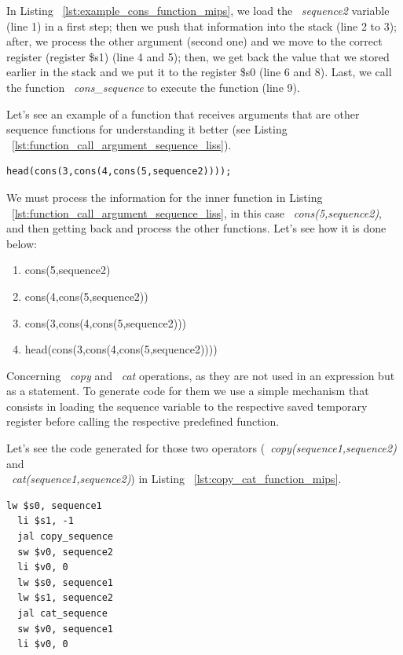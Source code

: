 \documentclass[
  oneside,
  11pt, a4paper,
  footinclude=true,
  headinclude=true,
  cleardoublepage=empty
]{scrbook}
\begin{document}
In Listing ~\ref{lst:example_cons_function_mips}, we load the ~\textit{sequence2} variable (line 1) in a first step; then we push that information into the stack (line 2 to 3); after, we process the other argument (second one) and we move to the correct register (register \$s1) (line 4 and 5); then, we get back the value that we stored earlier in the stack and we put it to the register \$s0 (line 6 and 8). Last, we call the function ~\textit{cons\_sequence} to execute the function (line 9).

Let's see an example of a function that receives arguments that are other sequence functions for understanding it better (see Listing ~\ref{lst:function_call_argument_sequence_liss}).

\begin{lstlisting}[caption={Example of using a function call as argument},label={lst:function_call_argument_sequence_liss}]
  head(cons(3,cons(4,cons(5,sequence2))));
\end{lstlisting}

We must process the information for the inner function in Listing ~\ref{lst:function_call_argument_sequence_liss}, in this case ~\textit{cons(5,sequence2)}, and then getting back and process the other functions.
Let's see how it is done below:

\begin{enumerate}
\item cons(5,sequence2)
\item cons(4,cons(5,sequence2))
\item cons(3,cons(4,cons(5,sequence2)))
\item head(cons(3,cons(4,cons(5,sequence2))))
\end{enumerate}

Concerning ~\textit{copy} and ~\textit{cat} operations, as they are not used in an expression but as a statement. To generate code for them we use a simple mechanism that consists in loading the sequence variable to the respective saved temporary register before calling the respective predefined function.

Let's see the code generated for those two operators (~\textit{copy(sequence1,sequence2)} and \\
 ~\textit{cat(sequence1,sequence2)}) in Listing ~\ref{lst:copy_cat_function_mips}.

\begin{lstlisting}[caption={Example of code generated for copy and cat statement},label={lst:copy_cat_function_mips}]
  lw $s0, sequence1		
  li $s1, -1		
  jal copy_sequence
  sw $v0, sequence2		
  li $v0, 0
  lw $s0, sequence1		
  lw $s1, sequence2		
  jal cat_sequence
  sw $v0, sequence1		
  li $v0, 0
\end{lstlisting}
\end{document}
